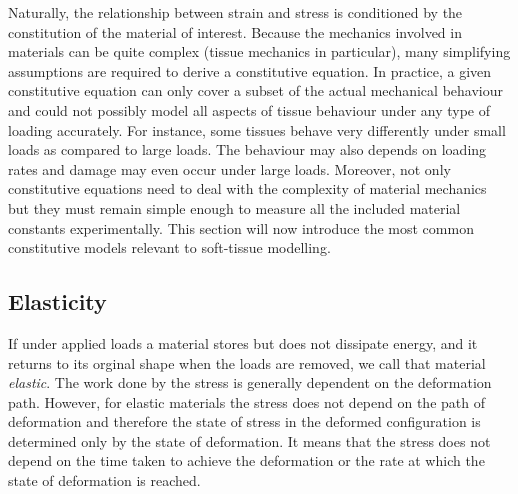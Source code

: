 \ON Naturally, the relationship between strain and stress is conditioned by the constitution of the material of interest. Because the mechanics involved in materials can be quite complex (tissue mechanics in particular), many simplifying assumptions are required to derive a constitutive equation. In practice, a given constitutive equation can only cover a subset of the actual mechanical behaviour and could not possibly model all aspects of tissue behaviour under any type of loading accurately. For instance, some tissues behave very differently under small loads as compared to large loads. The behaviour may also depends on loading rates and damage may even occur under large loads. Moreover, not only constitutive equations need to deal with the complexity of material mechanics but they must remain simple enough to measure all the included material constants experimentally. \OFF This section will now introduce the most common constitutive models relevant to soft-tissue modelling. 
    
    
	\subsection{Elasticity}	\label{chap2:elasticity}
If under applied loads a material stores but does not dissipate energy, and it returns to its orginal shape when the loads are removed, we call that material \emph{elastic}. The work done by the stress is generally dependent on the deformation path. However, for elastic materials the stress does not depend on the path of deformation and therefore the state of stress in the deformed configuration is determined only by the state of deformation. It means that the stress does not depend on the time taken to achieve the deformation or the rate at which the state of deformation is reached. 

